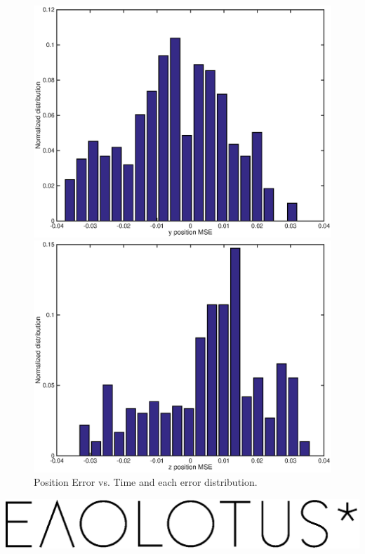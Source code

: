 \documentclass[letter, 10pt]{article}
\begin{document}
\begin{onehalfspacing}
\begin{figure}[h]
	\centering
	\begin{minipage}{.5\textwidth} 
  		\centering
    		\includegraphics[width=0.8\linewidth]{MSE_y.eps}
	\end{minipage}%
	\begin{minipage}{.5\textwidth} 
		\centering
    		\includegraphics[width=0.8\linewidth]{MSE_z.eps}
	\end{minipage}
	\centering
	\caption{Position Error vs. Time and each error distribution.}
	\label{MSEinterval}	
\end{figure}

\vfill
\begin{center}
	\includegraphics[scale = 0.4]{evolutus-black.eps}
\end{center}


\thispagestyle{fancy}
	
\end{onehalfspacing}
\end{document}
